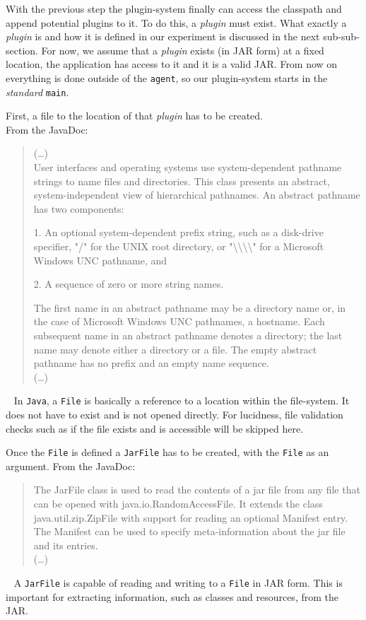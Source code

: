 With the previous step the plugin-system finally can access the classpath and append potential plugins to it.
To do this, a \textit{plugin} must exist.
What exactly a \textit{plugin} is and how it is defined in our experiment is discussed in the next sub-sub-section.
For now, we assume that a \textit{plugin} exists (in JAR form) at a fixed location, the application has access to it and it is a valid JAR.
From now on everything is done outside of the \texttt{agent}, so our plugin-system starts in the \textit{standard} \lstinline{main}.

First, a file to the location of that \textit{plugin} has to be created.\\
From the JavaDoc:
\begin{quote}
    (\dots)
    \\
    User interfaces and operating systems use system-dependent pathname strings to name files and directories. This class presents an abstract, system-independent view of hierarchical pathnames. An abstract pathname has two components:

        1. An optional system-dependent prefix string, such as a disk-drive specifier, "/" for the UNIX root directory, or "\textbackslash\textbackslash\textbackslash\textbackslash" for a Microsoft Windows UNC pathname, and

        2. A sequence of zero or more string names.

    The first name in an abstract pathname may be a directory name or, in the case of Microsoft Windows UNC pathnames, a hostname. Each subsequent name in an abstract pathname denotes a directory; the last name may denote either a directory or a file. The empty abstract pathname has no prefix and an empty name sequence.
    \\
    (\dots)
\end{quote}~\parencite{javadoc:file}
In \texttt{Java}, a \lstinline{File} is basically a reference to a location within the file-system.
It does not have to exist and is not opened directly.
For lucidness, file validation checks such as if the file exists and is accessible will be skipped here.

Once the \lstinline{File} is defined a \lstinline{JarFile} has to be created, with the \lstinline{File} as an argument.
From the JavaDoc:
\begin{quote}
    The JarFile class is used to read the contents of a jar file from any file that can be opened with java.io.RandomAccessFile. It extends the class java.util.zip.ZipFile with support for reading an optional Manifest entry. The Manifest can be used to specify meta-information about the jar file and its entries.
    \\
    (\dots)
\end{quote}~\textcite{javadoc:jar_file}
A \lstinline{JarFile} is capable of reading and writing to a \lstinline{File} in JAR form.
This is important for extracting information, such as classes and resources, from the JAR.

